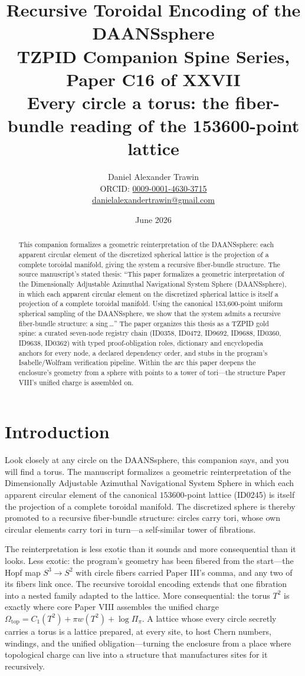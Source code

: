 \documentclass[11pt]{article}
\title{Recursive Toroidal Encoding of the DAANSsphere\\[0.6em]
\large TZPID Companion Spine Series, Paper C16 of XXVII\\
\normalsize Every circle a torus: the fiber-bundle reading of the 153600-point lattice}
\author{Daniel Alexander Trawin\\
\small ORCID: \href{https://orcid.org/0009-0001-4630-3715}{0009-0001-4630-3715}\\
\small \href{mailto:danielalexandertrawin@gmail.com}{danielalexandertrawin@gmail.com}}
\date{June 2026}
\theoremstyle{remark}
\begin{document}
\maketitle

\begin{abstract}
This companion formalizes a geometric reinterpretation of the DAANSsphere: each apparent circular element of the discretized spherical lattice is the projection of a complete toroidal manifold, giving the system a recursive fiber-bundle structure.
The source manuscript's stated thesis: ``This paper formalizes a geometric interpretation of the Dimensionally Adjustable Azimuthal Navigational System Sphere (DAANSsphere), in which each apparent circular element on the discretized spherical lattice is itself a projection of a complete toroidal manifold. Using the canonical 153,600-point uniform spherical sampling of the DAANSsphere, we show that the system admits a recursive fiber-bundle structure: a sing\,\ldots'' The paper organizes this thesis as a TZPID gold spine: a curated seven-node registry chain (ID0358, ID0472, ID9692, ID9688, ID0360, ID9638, ID0362) with typed proof-obligation roles, dictionary and encyclopedia anchors for every node, a declared dependency order, and stubs in the program's Isabelle/Wolfram verification pipeline. Within the arc this paper deepens the enclosure's geometry from a sphere with points to a tower of tori---the structure Paper VIII's unified charge is assembled on.
\end{abstract}

\section{Introduction}
\label{sec:intro}

Look closely at any circle on the DAANSsphere, this companion says, and you will find a torus. The manuscript formalizes a geometric reinterpretation of the Dimensionally Adjustable Azimuthal Navigational System Sphere in which each apparent circular element of the canonical $153600$-point lattice (ID0245) is itself the projection of a complete toroidal manifold. The discretized sphere is thereby promoted to a recursive fiber-bundle structure: circles carry tori, whose own circular elements carry tori in turn---a self-similar tower of fibrations.

The reinterpretation is less exotic than it sounds and more consequential than it looks. Less exotic: the program's geometry has been fibered from the start---the Hopf map $S^3 \to S^2$ with circle fibers carried Paper III's comma, and any two of its fibers link once. The recursive toroidal encoding extends that one fibration into a nested family adapted to the lattice. More consequential: the torus $T^2$ is exactly where core Paper VIII assembles the unified charge $\Omega_{\mathrm{top}} = C_1(T^2) + \pi w(T^2) + \log\Pi_\pi$. A lattice whose every circle secretly carries a torus is a lattice prepared, at every site, to host Chern numbers, windings, and the unified obligation---turning the enclosure from a place where topological charge can live into a structure that manufactures sites for it recursively.
\end{document}
